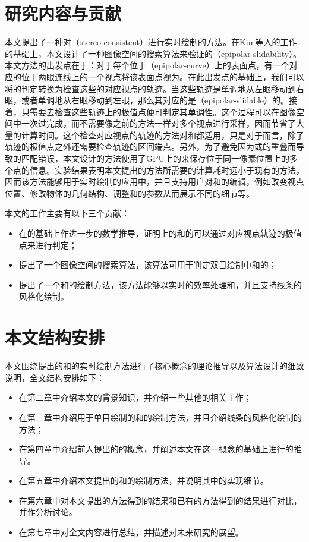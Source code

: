 \section{研究内容与贡献}

本文提出了一种对\stc{}（stereo-consistent）\con{}进行实时绘制的方法。在Kim等人的工作的基础上，本文设计了一种图像空间的搜索算法来验证\conp{}的\epsl{}（epipolar-slidability）。本文方法的出发点在于：对于每个位于\ec{}（epipolar-curve）上的表面点，有一个对应的位于两眼连线上的一个视点将该表面点视为\conp{}。在此出发点的基础上，我们可以将\epsl{}的判定转换为检查这些\conp{}的对应视点的轨迹。当这些轨迹是单调地从左眼移动到右眼，或者单调地从右眼移动到左眼，那么其对应的\conp{}是\epslb{}（epipolar-slidable）的。接着，只需要去检查这些轨迹上的极值点便可判定其单调性。这个过程可以在图像空间中一次过完成，而不需要像之前的方法一样对多个视点进行采样，因而节省了大量的计算时间。这个检查对应视点的轨迹的方法对\con{}和\scon{}都适用，只是对于\scon{}而言，除了轨迹的极值点之外还需要检查轨迹的区间端点。另外，为了避免因为\conp{}或\sconp{}的重叠而导致的匹配错误，本文设计的方法使用了GPU上的\ppll{}\cite{yang2010real}来保存位于同一像素位置上的多个点的信息。实验结果表明本文提出的方法所需要的计算耗时远小于现有的方法，因而该方法能够用于实时绘制的应用中，并且支持用户对\stc{}\con{}和\scon{}的编辑，例如改变视点位置、修改物体的几何结构、调整\con{}和\scon{}的参数从而展示不同的细节等。

本文的工作主要有以下三个贡献：

\begin{itemize}
    \item 在\epsl{}的基础上作进一步的数学推导，证明\ec{}上的\conp{}和\sconp{}的\stcy{}可以通过对应视点轨迹的极值点来进行判定；
    \item 提出了一个图像空间的搜索算法，该算法可用于判定双目绘制中\con{}和\scon{}的\epsl{}；
    \item 提出了一个\stc{}\con{}和\scon{}的绘制方法，该方法能够以实时的效率处理\con{}和\scon{}，并且支持线条的风格化绘制。
\end{itemize}

\section{本文结构安排}

本文围绕提出的\stc{}\con{}和\scon{}的实时绘制方法进行了核心概念的理论推导以及算法设计的细致说明，全文结构安排如下：

\begin{itemize}
    \item 在第二章中介绍本文的背景知识，并介绍一些其他的相关工作；
    \item 在第三章中介绍用于单目绘制的\con{}和\scon{}的绘制方法，并且介绍线条的风格化绘制的方法；
    \item 在第四章中介绍前人提出的\epsl{}的概念，并阐述本文在\epsl{}这一概念的基础上进行的推导。
    \item 在第五章中介绍本文提出的\stc{}\con{}和\scon{}的绘制方法，并说明其中的实现细节。
    \item 在第六章中对本文提出的方法得到的结果和已有的方法得到的结果进行对比，并作分析讨论。
    \item 在第七章中对全文内容进行总结，并描述对未来研究的展望。
\end{itemize}
